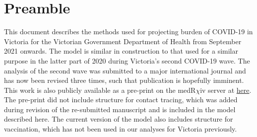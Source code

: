 \section{Preamble}
This document describes the methods used for projecting burden of COVID-19 in Victoria for the Victorian Government Department of Health from September 2021 onwards.
The model is similar in construction to that used for a similar purpose in the latter part of 2020 during Victoria's second COVID-19 wave.
The analysis of the second wave was submitted to a major international journal and has now been revised three times, such that publication is hopefully imminent.
This work is also publicly available as a pre-print on the medR\(\chi\)iv server at \href{https://www.medrxiv.org/content/10.1101/2021.04.03.21254866v2}{here}.
The pre-print did not include structure for contact tracing, which was added during revision of the re-submitted manuscript and is included in the model described here.
The current version of the model also includes structure for vaccination, which has not been used in our analyses for Victoria previously.